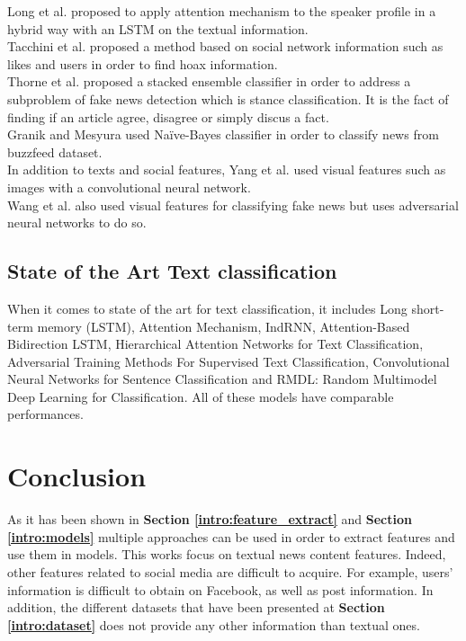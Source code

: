 Long et al. \cite{Long2017} proposed to apply attention mechanism to the speaker profile in a hybrid way with an LSTM on the textual information. \\

Tacchini et al.\cite{Tacchini2017} proposed a method based on social network information such as likes and users in order to find hoax information.\\

Thorne et al.\cite{Thorne2017} proposed a stacked ensemble classifier in order to address a subproblem of fake news detection which is stance classification. It is the fact of finding if an article agree, disagree or simply discus a fact. \\

Granik and Mesyura\cite{Granik2017} used Naïve-Bayes classifier in order to classify news from buzzfeed dataset.\\

In addition to texts and social features, Yang et al.\cite{Yang2018} used visual features such as images with a convolutional neural network. \\

Wang et al.\cite{Wang2018} also used visual features for classifying fake news but uses adversarial neural networks to do so. 
\subsection{State of the Art Text classification}
When it comes to state of the art for text classification, it includes Long short-term memory (LSTM)\cite{Hochreiter1997LongSM}, Attention Mechanism\cite{Vaswani2017AttentionIA}, IndRNN\cite{Li2018}, Attention-Based Bidirection LSTM\cite{zhou-etal-2016-attention}, Hierarchical Attention Networks for Text Classification\cite{yang_hierarchical_2016}, Adversarial Training Methods For Supervised Text Classification\cite{miyato_adversarial_2016}, Convolutional Neural Networks for Sentence Classification\cite{kim_convolutional_2014} and RMDL: Random Multimodel Deep Learning for Classification\cite{kowsari_rmdl:_2018}. All of these models have comparable performances. 
\section{Conclusion}
As it has been shown in \textbf{Section \ref{intro:feature_extract}} and \textbf{Section \ref{intro:models}} multiple approaches can be used in order to extract features and use them in models. This works focus on textual news content features. Indeed, other features related to social media are difficult to acquire. For example, users’ information is difficult to obtain on Facebook, as well as post information. In addition, the different datasets that have been presented at \textbf{Section \ref{intro:dataset}} does not provide any other information than textual ones. \\

